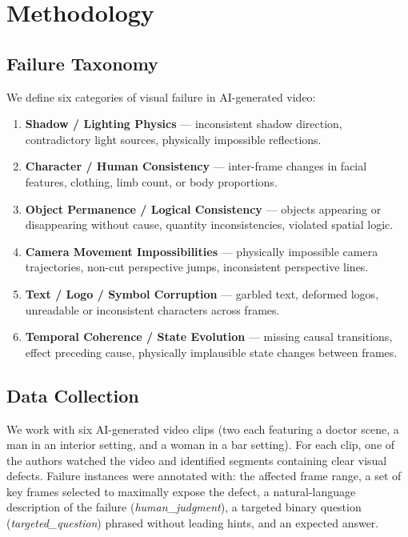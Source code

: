 \documentclass[11pt]{article}
\begin{document}
\section{Methodology}

\subsection{Failure Taxonomy}

We define six categories of visual failure in AI-generated video:

\begin{enumerate}
  \item \textbf{Shadow / Lighting Physics} --- inconsistent shadow direction, contradictory light sources, physically impossible reflections.
  \item \textbf{Character / Human Consistency} --- inter-frame changes in facial features, clothing, limb count, or body proportions.
  \item \textbf{Object Permanence / Logical Consistency} --- objects appearing or disappearing without cause, quantity inconsistencies, violated spatial logic.
  \item \textbf{Camera Movement Impossibilities} --- physically impossible camera trajectories, non-cut perspective jumps, inconsistent perspective lines.
  \item \textbf{Text / Logo / Symbol Corruption} --- garbled text, deformed logos, unreadable or inconsistent characters across frames.
  \item \textbf{Temporal Coherence / State Evolution} --- missing causal transitions, effect preceding cause, physically implausible state changes between frames.
\end{enumerate}

\subsection{Data Collection}

We work with six AI-generated video clips (two each featuring a doctor scene, a man in an interior setting, and a woman in a bar setting). For each clip, one of the authors watched the video and identified segments containing clear visual defects. Failure instances were annotated with: the affected frame range, a set of key frames selected to maximally expose the defect, a natural-language description of the failure (\textit{human\_judgment}), a targeted binary question (\textit{targeted\_question}) phrased without leading hints, and an expected answer.
\end{document}
